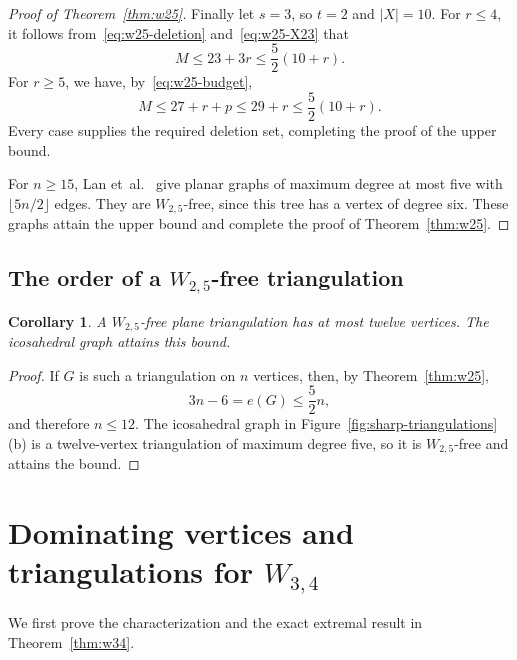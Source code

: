 \documentclass[11pt,a4paper]{article}
\newtheorem{corollary}[theorem]{Corollary}
\theoremstyle{remark}
\begin{document}
\begin{proof}[Proof of Theorem~\ref{thm:w25}]
Finally let $s=3$, so $t=2$ and $|X|=10$. For $r\le4$, it follows from~\eqref{eq:w25-deletion} and~\eqref{eq:w25-X23} that
\[
M\le23+3r\le\frac52(10+r).
\]
For $r\ge5$, we have, by~\eqref{eq:w25-budget},
\[
M\le27+r+p\le29+r\le\frac52(10+r).
\]
Every case supplies the required deletion set, completing the proof of the upper bound.

For $n\ge15$, Lan et~al.~\cite[Theorem~6]{LanShiSong2019} give planar graphs of maximum degree at most five with $\lfloor5n/2\rfloor$ edges. They are $W_{2,5}$-free, since this tree has a vertex of degree six. These graphs attain the upper bound and complete the proof of Theorem~\ref{thm:w25}.
\end{proof}


\subsection{The order of a \texorpdfstring{$W_{2,5}$}{W(2,5)}-free triangulation}

\begin{corollary}\label{prop:w25-triangulation}
A $W_{2,5}$-free plane triangulation has at most twelve vertices. The icosahedral graph attains this bound.
\end{corollary}

\begin{proof}
If $G$ is such a triangulation on $n$ vertices, then, by Theorem~\ref{thm:w25},
\[
3n-6=e(G)\le\frac52n,
\]
and therefore $n\le12$. The icosahedral graph in Figure~\ref{fig:sharp-triangulations}(b) is a twelve-vertex triangulation of maximum degree five, so it is $W_{2,5}$-free and attains the bound.
\end{proof}



\section{Dominating vertices and triangulations for \texorpdfstring{$W_{3,4}$}{W(3,4)}}
\label{sec:w34}

We first prove the characterization and the exact extremal result in
Theorem~\ref{thm:w34}.
\end{document}
